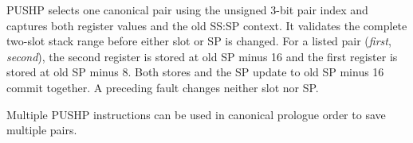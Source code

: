 PUSHP selects one canonical pair using the unsigned 3-bit pair index and captures both register values and the old
SS:SP context. It validates the complete two-slot stack range before either slot or SP is changed. For a listed pair
(\emph{first}, \emph{second}), the second register is stored at old SP minus 16 and the first register is stored at
old SP minus 8. Both stores and the SP update to old SP minus 16 commit together. A preceding fault changes neither
slot nor SP.

Multiple PUSHP instructions can be used in canonical prologue order to save multiple pairs.
